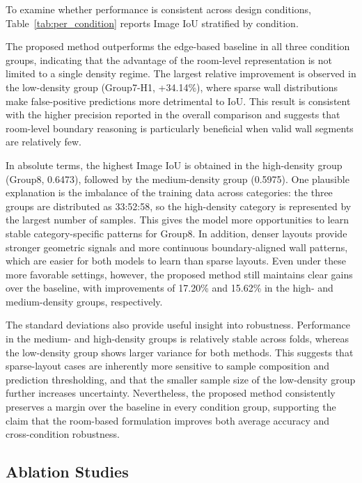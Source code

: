 To examine whether performance is consistent across design conditions, Table~\ref{tab:per_condition} reports Image IoU stratified by condition.

The proposed method outperforms the edge-based baseline in all three condition groups, indicating that the advantage of the room-level representation is not limited to a single density regime. The largest relative improvement is observed in the low-density group (Group7-H1, +34.14\%), where sparse wall distributions make false-positive predictions more detrimental to IoU. This result is consistent with the higher precision reported in the overall comparison and suggests that room-level boundary reasoning is particularly beneficial when valid wall segments are relatively few.

In absolute terms, the highest Image IoU is obtained in the high-density group (Group8, 0.6473), followed by the medium-density group (0.5975). One plausible explanation is the imbalance of the training data across categories: the three groups are distributed as 33:52:58, so the high-density category is represented by the largest number of samples. This gives the model more opportunities to learn stable category-specific patterns for Group8. In addition, denser layouts provide stronger geometric signals and more continuous boundary-aligned wall patterns, which are easier for both models to learn than sparse layouts. Even under these more favorable settings, however, the proposed method still maintains clear gains over the baseline, with improvements of 17.20\% and 15.62\% in the high- and medium-density groups, respectively.

The standard deviations also provide useful insight into robustness. Performance in the medium- and high-density groups is relatively stable across folds, whereas the low-density group shows larger variance for both methods. This suggests that sparse-layout cases are inherently more sensitive to sample composition and prediction thresholding, and that the smaller sample size of the low-density group further increases uncertainty. Nevertheless, the proposed method consistently preserves a margin over the baseline in every condition group, supporting the claim that the room-based formulation improves both average accuracy and cross-condition robustness.


\subsection{Ablation Studies}
\label{subsec:ablation}

